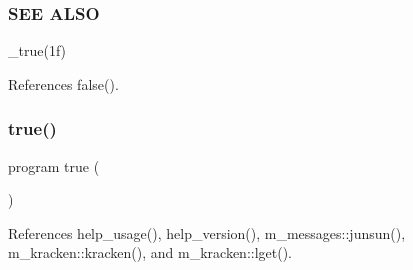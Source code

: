  \subsubsection*{S\+EE A\+L\+SO}

\+\_\+true(1f) 

References false().

\mbox{\label{__true_8f90_a7ed1d79677aed1b23489a4fe0bd16daa}} 
\subsubsection{\texorpdfstring{true()}{true()}}
{\footnotesize\ttfamily program true (\begin{DoxyParamCaption}{ }\end{DoxyParamCaption})}



References help\+\_\+usage(), help\+\_\+version(), m\+\_\+messages\+::junsun(), m\+\_\+kracken\+::kracken(), and m\+\_\+kracken\+::lget().

